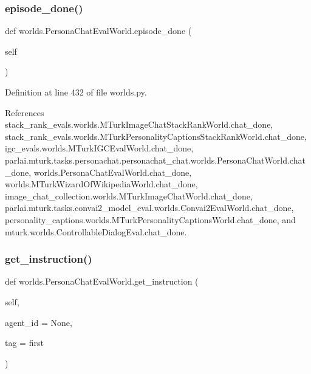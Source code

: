 \subsubsection{\texorpdfstring{episode\+\_\+done()}{episode\_done()}}
{\footnotesize\ttfamily def worlds.\+Persona\+Chat\+Eval\+World.\+episode\+\_\+done (\begin{DoxyParamCaption}\item[{}]{self }\end{DoxyParamCaption})}



Definition at line 432 of file worlds.\+py.



References stack\+\_\+rank\+\_\+evals.\+worlds.\+M\+Turk\+Image\+Chat\+Stack\+Rank\+World.\+chat\+\_\+done, stack\+\_\+rank\+\_\+evals.\+worlds.\+M\+Turk\+Personality\+Captions\+Stack\+Rank\+World.\+chat\+\_\+done, igc\+\_\+evals.\+worlds.\+M\+Turk\+I\+G\+C\+Eval\+World.\+chat\+\_\+done, parlai.\+mturk.\+tasks.\+personachat.\+personachat\+\_\+chat.\+worlds.\+Persona\+Chat\+World.\+chat\+\_\+done, worlds.\+Persona\+Chat\+Eval\+World.\+chat\+\_\+done, worlds.\+M\+Turk\+Wizard\+Of\+Wikipedia\+World.\+chat\+\_\+done, image\+\_\+chat\+\_\+collection.\+worlds.\+M\+Turk\+Image\+Chat\+World.\+chat\+\_\+done, parlai.\+mturk.\+tasks.\+convai2\+\_\+model\+\_\+eval.\+worlds.\+Convai2\+Eval\+World.\+chat\+\_\+done, personality\+\_\+captions.\+worlds.\+M\+Turk\+Personality\+Captions\+World.\+chat\+\_\+done, and mturk.\+worlds.\+Controllable\+Dialog\+Eval.\+chat\+\_\+done.

\mbox{\label{classworlds_1_1PersonaChatEvalWorld_ab3dd599a36597f672da5d54654a0266e}} 
\subsubsection{\texorpdfstring{get\+\_\+instruction()}{get\_instruction()}}
{\footnotesize\ttfamily def worlds.\+Persona\+Chat\+Eval\+World.\+get\+\_\+instruction (\begin{DoxyParamCaption}\item[{}]{self,  }\item[{}]{agent\+\_\+id = {\ttfamily None},  }\item[{}]{tag = {\ttfamily \textquotesingle{}first\textquotesingle{}} }\end{DoxyParamCaption})}



